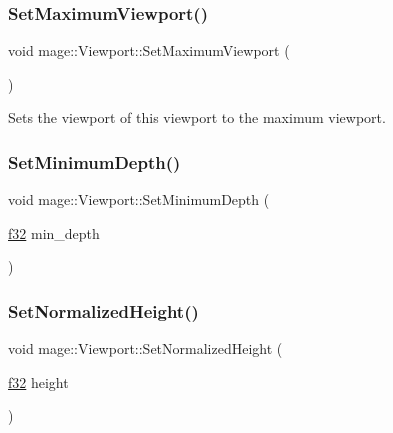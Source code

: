 \hypertarget{structmage_1_1_viewport_a5af006b8ec0464a924c3822265727ee2}{}\label{structmage_1_1_viewport_a5af006b8ec0464a924c3822265727ee2} 
\subsubsection{\texorpdfstring{Set\+Maximum\+Viewport()}{SetMaximumViewport()}}
{\footnotesize\ttfamily void mage\+::\+Viewport\+::\+Set\+Maximum\+Viewport (\begin{DoxyParamCaption}{ }\end{DoxyParamCaption})\hspace{0.3cm}{\ttfamily [noexcept]}}

Sets the viewport of this viewport to the maximum viewport. \hypertarget{structmage_1_1_viewport_ac4f5351670df1fe28f02ee4418a07084}{}\label{structmage_1_1_viewport_ac4f5351670df1fe28f02ee4418a07084} 
\subsubsection{\texorpdfstring{Set\+Minimum\+Depth()}{SetMinimumDepth()}}
{\footnotesize\ttfamily void mage\+::\+Viewport\+::\+Set\+Minimum\+Depth (\begin{DoxyParamCaption}\item[{\hyperlink{namespacemage_a6a44ad388483959dc4dff9f2aef91431}{f32}}]{min\+\_\+depth }\end{DoxyParamCaption})\hspace{0.3cm}{\ttfamily [noexcept]}}

\hypertarget{structmage_1_1_viewport_a20788dc2351ce73dcba3af89d348e4c1}{}\label{structmage_1_1_viewport_a20788dc2351ce73dcba3af89d348e4c1} 
\subsubsection{\texorpdfstring{Set\+Normalized\+Height()}{SetNormalizedHeight()}}
{\footnotesize\ttfamily void mage\+::\+Viewport\+::\+Set\+Normalized\+Height (\begin{DoxyParamCaption}\item[{\hyperlink{namespacemage_a6a44ad388483959dc4dff9f2aef91431}{f32}}]{height }\end{DoxyParamCaption})\hspace{0.3cm}{\ttfamily [noexcept]}}

